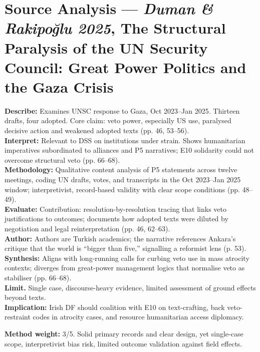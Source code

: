 \section*{Source Analysis — \textit{Duman \& Rakipoğlu 2025}, The Structural Paralysis of the UN Security Council: Great Power Politics and the Gaza Crisis}
\textbf{Describe:} Examines UNSC response to Gaza, Oct 2023–Jan 2025. Thirteen drafts, four adopted. Core claim: veto power, especially US use, paralysed decisive action and weakened adopted texts (pp. 46, 53–56).\\
\textbf{Interpret:} Relevant to DSS on institutions under strain. Shows humanitarian imperatives subordinated to alliances and P5 narratives; E10 solidarity could not overcome structural veto (pp. 66–68).\\
\textbf{Methodology:} Qualitative content analysis of P5 statements across twelve meetings, coding UN drafts, votes, and transcripts in the Oct 2023–Jan 2025 window; interpretivist, record-based validity with clear scope conditions (pp. 48–49).\\
\textbf{Evaluate:} Contribution: resolution-by-resolution tracing that links veto justifications to outcomes; documents how adopted texts were diluted by negotiation and legal reinterpretation (pp. 46, 62–63).\\
\textbf{Author:} Authors are Turkish academics; the narrative references Ankara’s critique that the world is “bigger than five,” signalling a reformist lens (p. 53).\\
\textbf{Synthesis:} Aligns with long-running calls for curbing veto use in mass atrocity contexts; diverges from great-power management logics that normalise veto as stabiliser (pp. 66–68).\\
\textbf{Limit.} Single case, discourse-heavy evidence, limited assessment of ground effects beyond texts.\\
\textbf{Implication:} Irish DF should coalition with E10 on text-crafting, back veto-restraint codes in atrocity cases, and resource humanitarian access diplomacy.

\textbf{Method weight:} 3/5. Solid primary records and clear design, yet single-case scope, interpretivist bias risk, limited outcome validation against field effects.

